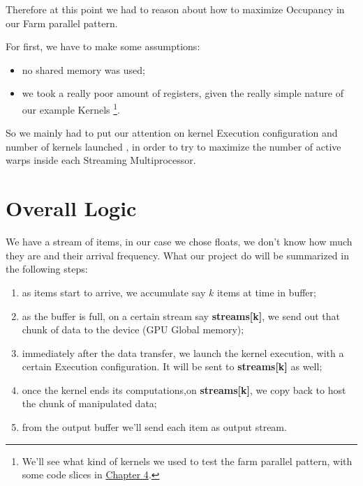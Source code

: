 Therefore at this point we had to reason about how to maximize Occupancy in our Farm parallel pattern.

For first, we have to make some assumptions:
\begin{itemize}
	\item no shared memory was used;
	\item we took a really poor amount of registers, given the really simple nature of our example Kernels \footnote{We'll see what kind of kernels we used to test the farm parallel pattern, with some code slices in  \hyperref[chap:impl]{Chapter 4}.}.\\
\end{itemize}  

So we mainly had to put our attention on kernel Execution configuration and number of kernels launched , in order to try to maximize the number of active warps inside each Streaming Multiprocessor.



\section{Overall Logic}

We have a stream of items, in our case we chose floats, we don't know how much they are and their arrival frequency.
What our project do will be summarized in the following steps:
\begin{enumerate}
	\item as items start to arrive, we accumulate say \(k\) items at time in buffer;
	\item as the buffer is full, on a certain stream say \textbf{streams[k]}, we send out that chunk of data to the device (GPU Global memory);
	\item immediately after the data transfer, we launch the kernel execution, with a certain Execution configuration. It will be sent to \textbf{streams[k]} as well;
	\item once the kernel ends its computations,on \textbf{streams[k]}, we copy back to host the chunk of manipulated data;
	\item from the output buffer we'll send each item as output stream. 
\end{enumerate}



